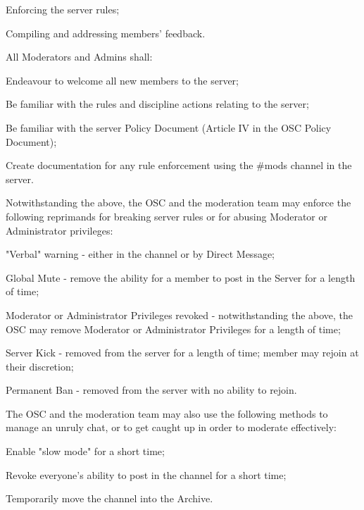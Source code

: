 \begin{longenum}[ label*=\thesubsection.\arabic*., align=left]
\begin{longenum}[label*=\arabic*., align=left]
		\item Enforcing the server rules;
		\item Compiling and addressing members' feedback.
		\end{longenum}	
	\item All Moderators and Admins shall:
		\begin{longenum}[label*=\arabic*., align=left]
		\item Endeavour to welcome all new members to the server;
		\item Be familiar with the rules and discipline actions relating to the server;
		\item Be familiar with the server Policy Document (Article IV in the OSC Policy Document);
		\item Create documentation for any rule enforcement using the \#mods channel in the server.
		\end{longenum}	
	\item Notwithstanding the above, the OSC and the moderation team may enforce the following reprimands for breaking server rules or for abusing Moderator or Administrator privileges:
		\begin{longenum}[label*=\arabic*., align=left]
		\item "Verbal" warning - either in the channel or by Direct Message;
		\item Global Mute - remove the ability for a member to post in the Server for a length of time;
		\item Moderator or Administrator Privileges revoked - notwithstanding the above, the OSC may remove Moderator or Administrator Privileges for a length of time;
		\item Server Kick - removed from the server for a length of time; member may rejoin at their discretion;
		\item Permanent Ban - removed from the server with no ability to rejoin.
		\end{longenum}	
	\item The OSC and the moderation team may also use the following methods to manage an unruly chat, or to get caught up in order to moderate effectively:
		\begin{longenum}[label*=\arabic*., align=left]
		\item Enable "slow mode" for a short time;
		\item Revoke everyone's ability to post in the channel for a short time;
		\item Temporarily move the channel into the Archive.

\end{longenum}
\end{longenum}
